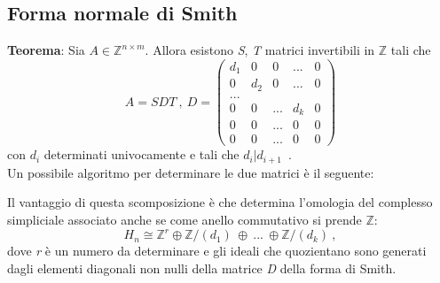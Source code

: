 \documentclass{article}
\begin{document}
	\subsection{Forma normale di Smith}
	\textbf{Teorema}: Sia \(A\in\mathbb{Z}^{n\times m}\). Allora esistono \textit{S}, \textit{T} matrici invertibili in \(\mathbb{Z}\) tali che
	\[A=SDT\ , \ D=\begin{pmatrix}d_1 & 0 & 0 & ... & 0\\
		0 & d_2 & 0 & ... & 0\\
		... \\
		0 & 0 & ... & d_k & 0\\
		0 & 0 & ... & 0 & 0\\
		0 & 0 & ... & 0 & 0
	\end{pmatrix}\]
	con \(d_i\) determinati univocamente e tali che \(d_i|d_{i+1}\)\ .\\ 
	Un possibile algoritmo per determinare le due matrici è il seguente: 
	\vspace{1cm}
	
	\vspace{1cm}
	Il vantaggio di questa scomposizione è che determina l'omologia del complesso simpliciale associato anche se come anello commutativo si prende \(\mathbb{Z}\): \[H_n\cong \mathbb{Z}^r \oplus\mathbb{Z}/(d_1)\ \oplus\ ...\ \oplus \mathbb{Z}/(d_k)\ ,\]
	dove \textit{r} è un numero da determinare e gli ideali che quozientano sono generati dagli elementi diagonali non nulli della matrice \textit{D} della forma di Smith.
\end{document}
